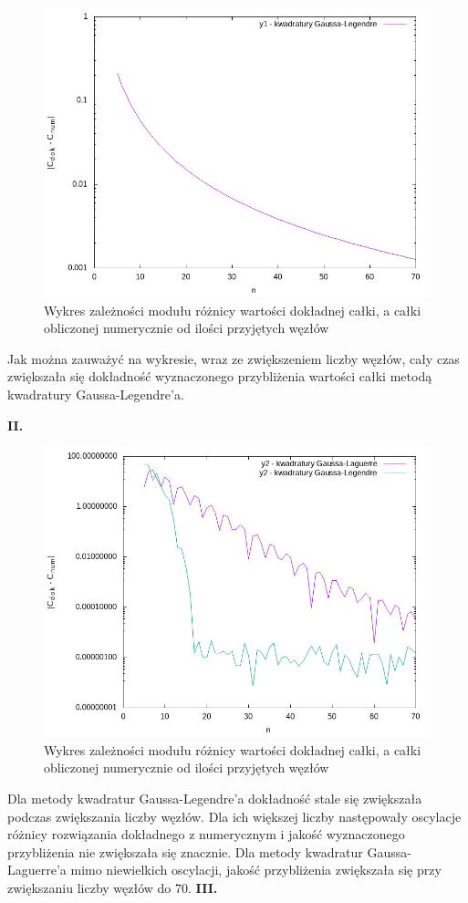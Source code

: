 \documentclass{article}
\begin{document}
\begin{figure}[H]
\begin{center}
\includegraphics[height=0.5\linewidth]{zad1.jpg}
\caption{Wykres zależności modułu różnicy wartości dokładnej całki, a całki obliczonej numerycznie od ilości przyjętych
węzłów}
\label{pierwszy} 
\end{center}
\end{figure}

Jak można zauważyć na wykresie, wraz ze zwiększeniem liczby węzłów, cały czas
zwiększała się dokładność wyznaczonego przybliżenia wartości całki metodą
kwadratury Gaussa-Legendre’a.

\newpage
\textbf{II.}

\begin{figure}[H]
\begin{center}
\includegraphics[height=0.5\linewidth]{zad2.jpg}
\caption{Wykres zależności modułu różnicy wartości dokładnej całki, a całki obliczonej numerycznie od ilości przyjętych
węzłów}
\label{pierwszy} 
\end{center}
\end{figure}
\newline
Dla metody kwadratur Gaussa-Legendre’a dokładność stale się zwiększała podczas
zwiększania liczby węzłów. Dla ich większej liczby następowały oscylacje różnicy
rozwiązania dokładnego z numerycznym i jakość wyznaczonego przybliżenia nie
zwiększała się znacznie. Dla metody kwadratur Gaussa-Laguerre’a mimo niewielkich oscylacji, jakość
przybliżenia zwiększała się przy zwiększaniu liczby węzłów do 70.
\newline
\textbf{III.}
\end{document}
